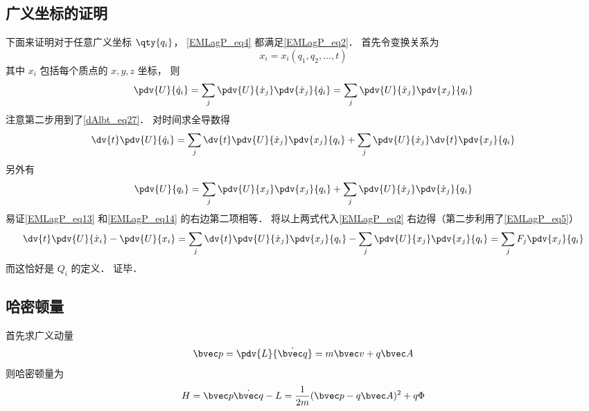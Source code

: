 \subsection{广义坐标的证明}
下面来证明对于任意广义坐标 $\qty{q_i}$， \autoref{EMLagP_eq4} 都满足\autoref{EMLagP_eq2}． 首先令变换关系为
\begin{equation}
x_i = x_i(q_1, q_2, \dots, t)
\end{equation}
其中 $x_i$ 包括每个质点的 $x, y, z$ 坐标， 则
\begin{equation}
\pdv{U}{\dot q_i} = \sum_j \pdv{U}{\dot x_j} \pdv{\dot x_j}{\dot q_i} = \sum_j \pdv{U}{\dot x_j} \pdv{x_j}{q_i}
\end{equation}
注意第二步用到了\autoref{dAlbt_eq27}． 对时间求全导数得
\begin{equation}\label{EMLagP_eq13}
\dv{t} \pdv{U}{\dot q_i} = \sum_j \dv{t}\pdv{U}{\dot x_j} \pdv{x_j}{q_i} + \sum_j \pdv{U}{\dot x_j} \dv{t} \pdv{x_j}{q_i}
\end{equation}
另外有
\begin{equation}\label{EMLagP_eq14}
\pdv{U}{q_i} = \sum_j \pdv{U}{x_j} \pdv{x_j}{q_i} + \sum_j \pdv{U}{\dot x_j} \pdv{\dot x_j}{q_i}
\end{equation}
易证\autoref{EMLagP_eq13} 和\autoref{EMLagP_eq14} 的右边第二项相等． 将以上两式代入\autoref{EMLagP_eq2} 右边得（第二步利用了\autoref{EMLagP_eq5}）
\begin{equation}
\dv{t} \pdv{U}{\dot x_i} - \pdv{U}{x_i} =  \sum_j \dv{t}\pdv{U}{\dot x_j} \pdv{x_j}{q_i} - \sum_j \pdv{U}{x_j} \pdv{x_j}{q_i} = \sum_j F_j \pdv{x_j}{q_i}
\end{equation}
而这恰好是 $Q_i$ 的定义．%
证毕．

\subsection{哈密顿量}

首先求广义动量
\begin{equation}
\bvec p = \pdv{L}{\dot{\bvec q}} = m\bvec v + q\bvec A
\end{equation}
则哈密顿量为
\begin{equation}
H = \bvec p \dot{\bvec q} - L = \frac{1}{2m}(\bvec p - q\bvec A)^2 + q\Phi
\end{equation}
